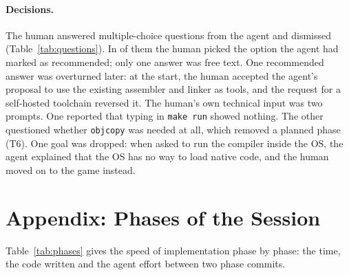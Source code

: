 \documentclass{article}
\begin{document}
\paragraph{Decisions.} The human answered \nquestions{} multiple-choice questions from
the agent and dismissed \ndismissed{} (Table~\ref{tab:questions}). In \nrecommended{} of
them the human picked the option the agent had marked as recommended; only one answer was
free text. One recommended answer was overturned later: at the start, the human accepted
the agent's proposal to use the existing assembler and linker as tools, and the request
for a self-hosted toolchain reversed it. The human's own technical input was two prompts. One reported that typing in
\texttt{make run} showed nothing. The other questioned whether \texttt{objcopy} was needed
at all, which removed a planned phase (T6). One goal was dropped: when asked to run the
compiler inside the OS, the agent explained that the OS has no way to load native code,
and the human moved on to the game instead.





\section*{Appendix: Phases of the Session}\label{app:phases}

Table~\ref{tab:phases} gives the speed of implementation phase by phase: the time, the
code written and the agent effort between two phase commits.


\end{document}
